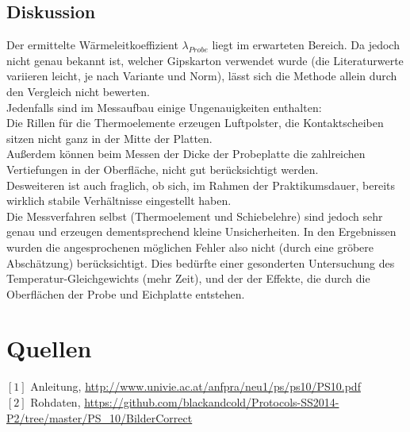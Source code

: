 \documentclass[12pt,a4paper]{article}
\begin{document}
\begin{multicols}{2}
\subsection{Diskussion}
Der ermittelte Wärmeleitkoeffizient $\lambda_{Probe}$ liegt im erwarteten Bereich. Da jedoch nicht genau bekannt ist, welcher Gipskarton verwendet wurde (die Literaturwerte variieren leicht, je nach Variante und Norm), lässt sich die Methode allein durch den Vergleich nicht bewerten.\\
Jedenfalls sind im Messaufbau einige Ungenauigkeiten enthalten:\\
Die Rillen für die Thermoelemente erzeugen Luftpolster, die Kontaktscheiben sitzen nicht ganz in der Mitte der Platten.\\
Außerdem können beim Messen der Dicke der Probeplatte die zahlreichen Vertiefungen in der Oberfläche, nicht gut berücksichtigt werden.\\
Desweiteren ist auch fraglich, ob sich, im Rahmen der Praktikumsdauer, bereits wirklich stabile Verhältnisse eingestellt haben.\\
Die Messverfahren selbst (Thermoelement und Schiebelehre) sind jedoch sehr genau und erzeugen dementsprechend kleine Unsicherheiten. In den Ergebnissen wurden die angesprochenen möglichen Fehler also nicht (durch eine gröbere Abschätzung) berücksichtigt. Dies bedürfte einer gesonderten Untersuchung des Temperatur-Gleichgewichts (mehr Zeit), und der der Effekte, die durch die Oberflächen der Probe und Eichplatte entstehen.\\


\section{Quellen}
$[1]$ Anleitung, \url{http://www.univie.ac.at/anfpra/neu1/ps/ps10/PS10.pdf}\\
$[2]$ Rohdaten, \url{https://github.com/blackandcold/Protocols-SS2014-P2/tree/master/PS_10/BilderCorrect}\\

\end{multicols}
\end{document}
